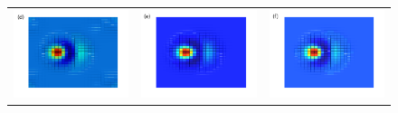 \documentclass[12pt]{CSUNthesis}
\begin{document}
\begin{center}
\begin{figure}[h]
\begin{tabular}{@{}ccc@{}}
  \includegraphics[height=.18\textheight]{images/27N_split_fourier_topdown.pdf}&
  \includegraphics[height=.18\textheight]{images/27N_split_direct_topdown.pdf}&
  \includegraphics[height=.18\textheight]{images/27N_fourier_topdown.pdf}\\

\end{tabular}
\end{figure}
\end{center}
\end{document}
